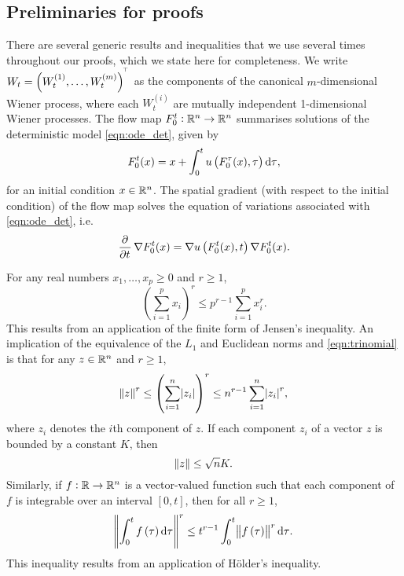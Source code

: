\subsection{Preliminaries for proofs}\label{app:gauss}

There are several generic results and inequalities that we use several times throughout our proofs, which we state here for completeness.
We write \(W_t = \left(W_t^{(1)}, \hdots, W_t^{(m)}\right)^{^{\!\top}}\) as the components of the canonical \(m\)-dimensional Wiener process, where each \(W_t^{(i)}\) are mutually independent 1-dimensional Wiener processes.
The flow map \(F_0^t: \mathbb{R}^n \to \mathbb{R}^n\) summarises solutions of the deterministic model \cref{eqn:ode_det}, given by
\begin{equation}
	F_{0}^{t}(x) = x + \int_{0}^{t}{u\left(F_{0}^{\tau}(x), \tau\right)\dif \tau},
	\label{eqn:flow_map_int}
\end{equation}
for an initial condition \(x \in \mathbb{R}^n\).
The spatial gradient (with respect to the initial condition) of the flow map solves the equation of variations associated with \cref{eqn:ode_det}, i.e.
\begin{equation}
	\dpd{}{t}\nabla F_0^t(x) = \nabla u\left(F_0^t(x), t\right)\nabla F_0^t(x).
	\label{eqn:eqn_of_vars}
\end{equation}

For any real numbers \(x_1,\hdots,x_p \geq 0\) and \(r \geq 1\),
\begin{equation}
	\left(\sum_{i=1}^p{x_i}\right)^r \leq p^{r-1}\sum_{i=1}^p{x_i^r}.
	\label{eqn:trinomial}
\end{equation}
This results from an application of the finite form of Jensen's inequality.
An implication of the equivalence of the \(L_1\) and Euclidean norms and \cref{eqn:trinomial} is that for any \(z \in \mathbb{R}^n\) and \(r \geq 1\),
\begin{equation}
	\norm{z}^r \leq \left(\sum_{i = 1}^n{\abs{z_i}}\right)^r \leq n^{r-1}\sum_{i=1}^n{\abs{z_i}^r},
	\label{eqn:norm_trinomial}
\end{equation}
where \(z_i\) denotes the \(i\)th component of \(z\).
If each component \(z_i\) of a vector \(z\) is bounded by a constant \(K\), then
\begin{equation}\label{eqn:bound_vector}
	\norm{z} \leq \sqrt{n} K.
\end{equation}
Similarly, if \(f: \mathbb{R} \to \mathbb{R}^n\) is a vector-valued function such that each component of \(f\) is integrable over an interval \([0,t]\), then for all \(r \geq 1\),
\begin{equation}
	\norm{\int_0^t{f\left(\tau\right)\dif\tau}}^r \leq t^{r-1}\int_0^t{\norm{f\left(\tau\right)}^r\dif\tau}.
	\label{eqn:convex_integral}
\end{equation}
This inequality results from an application of H\"{o}lder's inequality.


